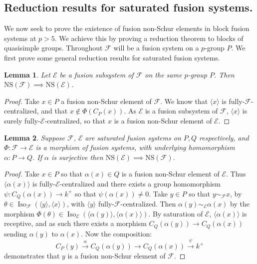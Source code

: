 \documentclass{amsart}
\theoremstyle{plain}\newtheorem{theorem}{Theorem}[section]
\theoremstyle{plain}\newtheorem{conjecture}[theorem]{Conjecture}
\theoremstyle{plain}\newtheorem{corollary}[theorem]{Corollary}
\theoremstyle{plain}\newtheorem{lemma}[theorem]{Lemma}
\theoremstyle{plain}\newtheorem{proposition}[theorem]{Proposition}
\theoremstyle{plain}\newtheorem{statement}[theorem]{}
\theoremstyle{definition}\newtheorem{definition}[theorem]{Definition}
\theoremstyle{definition}\newtheorem{example}[theorem]{Example}
\theoremstyle{definition}\newtheorem{examples}[theorem]{Examples}
\theoremstyle{definition}\newtheorem{notation}[theorem]{Notation}
\theoremstyle{definition}\newtheorem{remark}[theorem]{Remark}
\theoremstyle{definition}\newtheorem{remarks}[theorem]{Remarks}
\theoremstyle{definition}\newtheorem{question}[theorem]{Question}
\theoremstyle{definition}\newtheorem{propositiondefinition}[theorem]{Definition/Proposition}
\newcommand{\F}{\mathcal{F}}
\begin{document}
 \subsection{Reduction results for saturated fusion systems.}
 We now seek to prove the existence of fusion non-Schur elements in block fusion systems at $p>5$. We achieve this by proving a reduction theorem to blocks of quasisimple groups.  Throughout $\mathcal{F}$ will be a fusion system on a $p$-group $P$. We first prove some general reduction results for saturated fusion systems. 
 \begin{lemma}\label{lem:subsystem} Let $\mathcal{E}$ be a fusion subsystem of $\mathcal{F}$ on the same $p$-group $P$. Then $\mathrm{NS}(\mathcal{F}) \implies \mathrm{NS}(\mathcal{E})$.
 \end{lemma}
 \begin{proof} Take $x \in P$ a fusion non-Schur element of $\mathcal{F}$. We know that $\langle x \rangle$ is fully-$\mathcal{F}$-centralized, and that $ x \not \in \Phi(C_P(x))$. As $\mathcal{E}$ is a fusion subsystem of $\mathcal{F}$, $\langle x \rangle$ is surely fully-$\mathcal{E}$-centralized, so that $x$ is a fusion non-Schur element of $\mathcal{E}$.
 \end{proof}
 \begin{lemma}\label{lem:surjection} Suppose $\mathcal{F}$, $\mathcal{E}$ are saturated fusion systems on $P,Q$ respectively, and $\Phi: \mathcal{F} \rightarrow \mathcal{E}$ is a morphism of fusion systems, with underlying homomorphism $\alpha: P \rightarrow Q$.  If $\alpha$ is surjective then $\mathrm{NS}(\mathcal{E}) \implies \mathrm{NS}(\mathcal{F})$.
 \end{lemma}
 \begin{proof} 
     Take $x \in P$ so that $\alpha(x) \in Q$ is a fusion non-Schur element of $\mathcal{E}$. Thus $\langle \alpha(x) \rangle$ is fully-$\mathcal{E}$-centralized and there exists a group homomorphism $\psi:C_Q(\alpha(x)) \rightarrow k^+$ so that $\psi(\alpha(x)) \not=0$. Take $y \in P$ so that $y \sim_\mathcal{F} x$, by $\theta \in \operatorname{Iso}_\F(\langle y \rangle, \langle x \rangle)$, with $\langle y \rangle$ fully-$\mathcal{F}$-centralized. Then $\alpha(y) \sim_\mathcal{E} \alpha(x)$ by the morphism $\Phi(\theta) \in \operatorname{Iso}_\mathcal{E}( \langle \alpha(y) \rangle, \langle \alpha(x) \rangle)$. By saturation of $\mathcal{E}$, $ \langle \alpha(x) \rangle$ is receptive, and as such there exists a morphism $C_Q(\alpha(y)) \rightarrow C_Q(\alpha(x))$ sending $\alpha(y)$ to $\alpha(x)$. Now the composition: 
      $$C_P(y) \xrightarrow{\alpha} C_{Q}( \alpha(y))\rightarrow C_{Q}(\alpha(x)) \xrightarrow\psi k^+$$
      demonstrates that $y$ is a fusion non-Schur element of $\mathcal{F}$.
 \end{proof}
\end{document}
